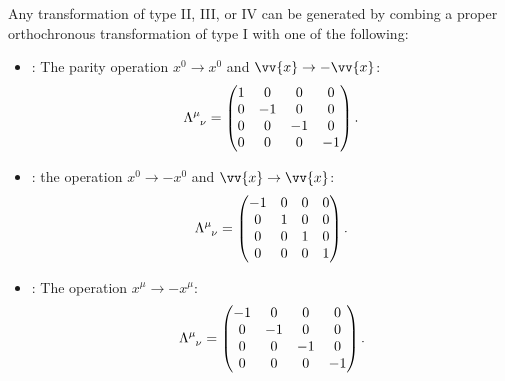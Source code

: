 \documentclass[fleqn]{NotesClass}
\begin{document}
\begin{appendices}
        Any transformation of type II, III, or IV can be generated by combing a proper orthochronous transformation of type I with one of the following:
        \begin{itemize}
            \item {}: The parity operation \(x^0 \to x^0\) and \(\vv{x} \to -\vv{x}\):
            \begin{equation}
                \tensor{\Lambda}{^\mu_\nu} = 
                \begin{pmatrix}
                    1 & 0 & 0 & 0\\
                    0 & -1 & 0 & 0\\
                    0 & 0 & -1 & 0\\
                    0 & 0 & 0 & -1
                \end{pmatrix}
                .
            \end{equation}
            \item {}: the operation \(x^0 \to -x^0\) and \(\vv{x} \to \vv{x}\):
            \begin{equation}
                \tensor{\Lambda}{^\mu_\nu} =
                \begin{pmatrix}
                    -1 & 0 & 0 & 0\\
                    0 & 1 & 0 & 0\\
                    0 & 0 & 1 & 0\\
                    0 & 0 & 0 & 1
                \end{pmatrix}
                .
            \end{equation}
            \item {}: The operation \(x^\mu \to -x^\mu\):
            \begin{equation}
                \tensor{\Lambda}{^\mu_\nu} =
                \begin{pmatrix}
                    -1 & 0 & 0 & 0\\
                    0 & -1 & 0 & 0\\
                    0 & 0 & -1 & 0\\
                    0 & 0 & 0 & -1
                \end{pmatrix}
                .
            \end{equation}
        \end{itemize}
        

\end{appendices}
\end{document}
